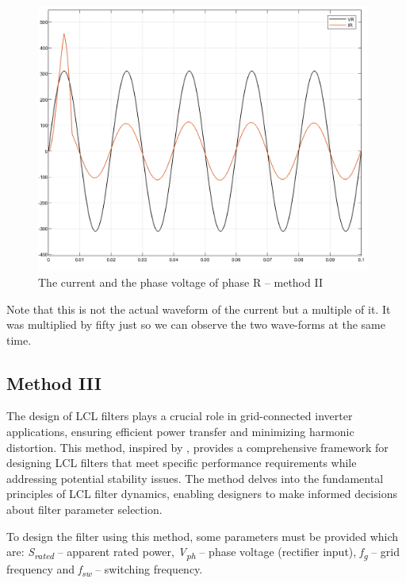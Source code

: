\documentclass[12pt,a4paper]{book}
\begin{document}
\begin{figure}[h!]
  \centering
  \includegraphics[width=11cm]{image23.png}
  \caption{The current and the phase voltage of phase R -- method II}
  \label{fig:image23}
\end{figure}
Note that this is not the actual waveform of the current but a multiple of it. It was multiplied by fifty just so we can observe the two wave-forms at the same time.

\subsection{Method III}
The design of LCL filters plays a crucial role in grid-connected inverter applications, ensuring efficient power transfer and minimizing harmonic distortion. This method, inspired by \cite{lcl2020}, provides a comprehensive framework for designing LCL filters that meet specific performance requirements while addressing potential stability issues. The method delves into the fundamental principles of LCL filter dynamics, enabling designers to make informed decisions about filter parameter selection.

To design the filter using this method, some parameters must be provided which are: \emph{S\textsubscript{rated}} -- apparent rated power, \emph{V\textsubscript{ph}} -- phase voltage (rectifier input), \emph{f\textsubscript{g}} -- grid frequency and \emph{f\textsubscript{sw}} -- switching frequency.
\end{document}
